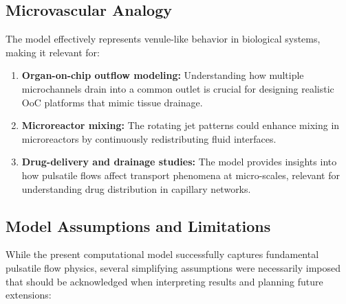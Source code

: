 \documentclass[12pt,a4paper]{article}
\begin{document}
\subsection{Microvascular Analogy}

The model effectively represents venule-like behavior in biological systems, making it relevant for:

\begin{enumerate}
  \item \textbf{Organ-on-chip outflow modeling:} Understanding how multiple microchannels drain into a common outlet is crucial for designing realistic OoC platforms that mimic tissue drainage.
  
  \item \textbf{Microreactor mixing:} The rotating jet patterns could enhance mixing in microreactors by continuously redistributing fluid interfaces.
  
  \item \textbf{Drug-delivery and drainage studies:} The model provides insights into how pulsatile flows affect transport phenomena at micro-scales, relevant for understanding drug distribution in capillary networks.
\end{enumerate}

\subsection{Model Assumptions and Limitations}

While the present computational model successfully captures fundamental pulsatile flow physics, several simplifying assumptions were necessarily imposed that should be acknowledged when interpreting results and planning future extensions:
\end{document}
